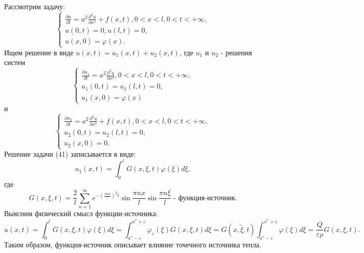 \documentclass[11pt]{article}
\begin{document}
Рассмотрим задачу:
\begin{equation}
\begin{cases}
\frac{\partial u}{\partial t} = a^2\frac{\partial^2u}{\partial x^2} + f(x, t), 0 < x < l, 0 < t < +\infty, \\
u(0, t) = 0, u(l, t) = 0, \\
u(x, 0) = \varphi(x).
\end{cases}
\end{equation}
Ищем решение в виде $u(x, t) = u_1(x, t) + u_2(x, t)$, где $u_1$ и $u_2$ - решения систем
\begin{equation}
\begin{cases}
\frac{\partial u_1}{\partial t} = a^2\frac{\partial^2 u}{\partial x^2}, 0 < x < l, 0 < t < +\infty, \\
u_1(0, t) = u_1(l, t) = 0, \\
u_1(x, 0) = \varphi(x)
\end{cases}
\end{equation}
и
\begin{equation}
\begin{cases}
\frac{\partial u_2}{\partial t} = a^2\frac{\partial^2 u}{\partial x^2} + f(x, t), 0 < x < l, 0 < t < +\infty, \\
u_2(0, t) = u_2(l, t) = 0, \\
u_2(x, 0) = 0.
\end{cases}
\end{equation}
Решение задачи (41) записывается в виде:
\begin{equation}
u_1(x, t) = \int_0^lG(x, \xi, t)\varphi(\xi)d\xi,
\end{equation}
где
\begin{equation*}
G(x, \xi, t) = \frac2l\sum_{n = 1}^{\infty}e^{-\left(\frac{\pi n a}l\right)^2t}\sin\frac{\pi nx}l\sin\frac{\pi n\xi}l \text{ - функция-источник.}
\end{equation*}
Выясним физический смысл функции-источника:
\begin{equation}
u(x, t) = \int_0^lG(x, \xi, t)\varphi(\xi)d\xi = \int_{x^* - \varepsilon}^{x^* + \varepsilon}\varphi_{\varepsilon}(\xi)G(x, \xi, t)d\xi =
G(x, \tilde{\xi}, t)\int_{x^* - \varepsilon}^{x^* + \varepsilon}\varphi(\xi)d\xi = \frac{Q}{\varepsilon\rho}G(x, \xi, t).
\end{equation}
Таким образом, функция-источник описывает влияние точечного источника тепла.
\end{document}
